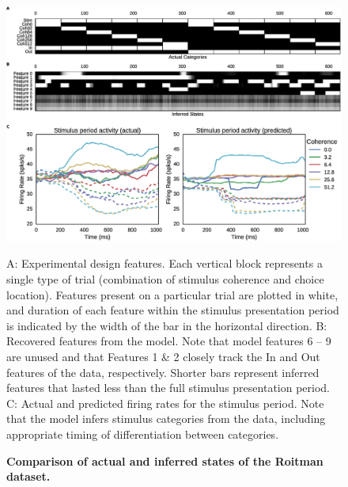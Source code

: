 \documentclass[10pt,letterpaper]{article}
\newcommand{\added}[1]{\textcolor{added}{#1}}
\begin{document}
\begin{figure}[!h]
    \includegraphics[width=\linewidth]{roitman}
	\caption{\bf Comparison of actual and inferred states of the Roitman dataset.}
    A: \added{Experimental design features. Each vertical block represents a single type of trial (combination of stimulus coherence and choice location). Features present on a particular trial are plotted in white, and duration of each feature within the stimulus presentation period is indicated by the width of the bar in the horizontal direction. B: Recovered features from the model.}
	Note that model features 6 -- 9 are unused and that Features 1 \& 2 closely track the In and Out features of the data, respectively. \added{Shorter bars represent inferred features that lasted less than the full stimulus presentation period.} C: Actual and predicted firing rates for the stimulus period. Note that the model infers stimulus categories from the data, including appropriate timing of differentiation between categories.
	\label{roitman}
\end{figure}
\end{document}
